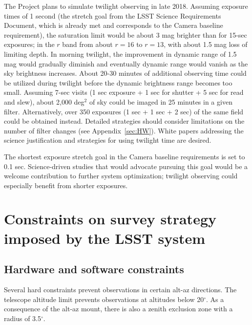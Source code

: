 \documentclass[DM,toc,usenatbib]{lsstdoc}
\begin{document}
The Project plans to simulate twilight observing in late 2018.
Assuming exposure times of 1 second (the stretch goal from the LSST Science Requirements Document, 
which is already met and corresponds to the Camera baseline requirement), the saturation limit would be
about 3 mag brighter than for 15-sec exposures; in the $r$ band from about $r=16$ to $r=13$,
with about 1.5 mag loss of limiting depth. In morning twilight, the improvement in dynamic range of 1.5 mag would gradually
diminish and eventually dynamic range would vanish as the sky brightness increases. About 20-30 minutes
of additional observing time could be utilized during twilight before the dynamic brightness range becomes
too small. Assuming 7-sec visits (1 sec exposure + 1 sec for shutter + 5 sec for read and slew), about 
2,000 deg$^2$ of sky could be imaged in 25 minutes in a given filter. Alternatively, over 
350 exposures (1 sec + 1 sec + 2 sec) of the same field could be obtained instead.  Detailed strategies
should consider limitations on the number of filter changes (see Appendix~\ref{sec:HW}). 
White papers addressing the science justification and strategies for using twilight time are desired.

The shortest exposure stretch goal in the Camera baseline requirements is set to 0.1 sec. Science-driven
studies that would advocate pursuing this goal would be a welcome contribution to further system
optimization; twilight observing could especially benefit from shorter exposures. 
 

\section{Constraints on survey strategy imposed by the LSST system} 

\subsection{Hardware and software constraints \label{sec:HW}}


Several hard constraints prevent observations in certain alt-az directions. The telescope altitude limit
prevents observations at altitudes below 20$^\circ$.  As a consequence of the alt-az mount, there
is also a zenith exclusion zone with a radius of 3.5$^\circ$. 
\end{document}
